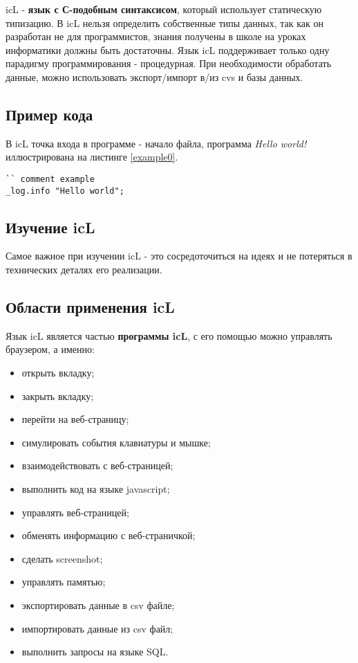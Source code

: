 \documentclass[a4paper, 14pt]{extarticle}
\newenvironment{icItems}
	{ \begin{itemize} [noitemsep,nolistsep] }
	{ \end{itemize} }
\begin{document}
icL - \textbf{язык с С-подобным синтаксисом}, который использует статическую типизацию. В icL нельзя определить собственные типы данных, так как он разработан не для программистов, знания получены в школе на уроках информатики должны быть достаточны. Язык icL поддерживает только одну парадигму программирования - процедурная. При необходимости обработать данные, можно использовать экспорт/импорт в/из cvs и базы данных.

\subsection{Пример кода}

В icL точка входа в программе - начало файла, программа \textit{Hello world!} иллюстрирована на листинге \ref{example0}.

\begin{lstlisting}[caption=Пример, label=example0]
`` comment example
_log.info "Hello world";
\end{lstlisting}

\subsection{Изучение icL}

Самое важное при изучении icL - это сосредоточиться на идеях и не потеряться в технических деталях его реализации.

\subsection{Области применения icL}

Язык icL является частью \textbf{программы icL}, с его помощью можно управлять браузером, а именно:
\begin{icItems}
\item
	открыть вкладку;
\item
	закрыть вкладку;
\item
	перейти на веб-страницу;
\item
	симулировать события клавиатуры и мышке;
\item
	взаимодействовать с веб-страницей;
\item
	выполнить код на языке javascript;
\item
	управлять веб-страницей;
\item
	обменять информацию с веб-страничкой;
\item
	сделать screenshot;
\item
	управлять памятью;
\item
	экспортировать данные в csv файле;
\item
	импортировать данные из csv файл;
\item
	выполнить запросы на языке SQL.
\end{icItems}
\end{document}
